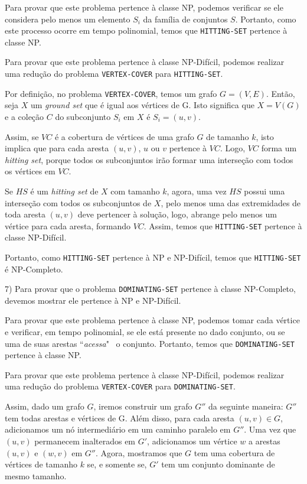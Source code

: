 \documentclass[]{article}
\begin{document}
Para provar que este problema pertence à classe NP, podemos verificar se ele considera pelo menos um elemento $S_i$ da família de conjuntos $S$. Portanto, como este processo ocorre em tempo polinomial, temos que \texttt{HITTING-SET} pertence à classe NP.

Para provar que este problema pertence à classe NP-Difícil, podemos realizar uma redução do problema \texttt{VERTEX-COVER} para \texttt{HITTING-SET}. 

Por definição, no problema \texttt{VERTEX-COVER}, temos um grafo $G=(V, E)$. Então, seja $X$ um \textit{ground set} que é igual aos vértices de G. Isto significa que $X=V(G)$ e a coleção $C$ do subconjunto $S_i$ em $X$ é $S_i=(u, v)$. 

Assim, se $VC$ é a cobertura de vértices de uma grafo $G$ de tamanho $k$, isto implica que para cada aresta $(u, v)$, $u$ ou $v$ pertence à $VC$. Logo, $VC$ forma um \textit{hitting set}, porque todos os subconjuntos irão formar uma interseção com todos os vértices em $VC$. 

Se $HS$ é um \textit{hitting set} de $X$ com tamanho $k$, agora, uma vez $HS$ possui uma interseção com todos os subconjuntos de $X$, pelo menos uma das extremidades de toda aresta $(u, v)$ deve pertencer à solução, logo, abrange pelo menos um vértice para cada aresta, formando $VC$. Assim, temos que \texttt{HITTING-SET} pertence à classe NP-Difícil.

Portanto, como \texttt{HITTING-SET} pertence à NP e NP-Difícil, temos que \texttt{HITTING-SET} é NP-Completo.

\newpage

7) Para provar que o problema \texttt{DOMINATING-SET} pertence à classe NP-Completo, devemos mostrar ele pertence à NP e NP-Difícil.

Para provar que este problema pertence à classe NP, podemos tomar cada vértice e verificar, em tempo polinomial, se ele está presente no dado conjunto, ou se uma de suas arestas ``\textit{acessa}" \, o conjunto. Portanto, temos que \texttt{DOMINATING-SET} pertence à classe NP.

Para provar que este problema pertence à classe NP-Difícil, podemos realizar uma redução do problema \texttt{VERTEX-COVER} para \texttt{DOMINATING-SET}.

Assim, dado um grafo $G$, iremos construir um grafo $G''$ da seguinte maneira: $G''$ tem todas arestas e vértices de G. Além disso, para cada aresta $(u, v) \in G$, adicionamos um nó intermediário em um caminho paralelo em $G''$. Uma vez que $(u, v)$ permanecem inalterados em $G'$, adicionamos um vértice $w$ a arestas $(u, v)$ e $(w, v)$ em $G''$. Agora, mostramos que $G$ tem uma cobertura de vértices de tamanho $k$ se, e somente se, $G'$ tem um conjunto dominante de mesmo tamanho.
\end{document}
